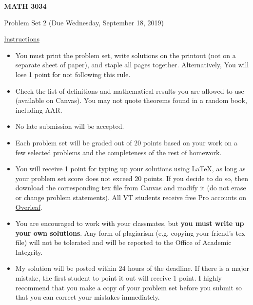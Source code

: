 \documentclass[12pt]{amsart}
\begin{document}

\hfill{}

\vspace{0.3in}
\begin{center}
{\Large{\textbf{MATH 3034}}}

\vspace{0.1in}
{\large{Problem Set 2 (Due Wednesday, September 18, 2019)}}
\end{center}

\vspace{0.3in}
\noindent
\underline{Instructions}
\begin{itemize}
\vspace{0.1in}
\item You must print the problem set, write solutions on the printout (not on a separate sheet of paper), and staple all pages together.  Alternatively,  You will lose 1 point for not following this rule.
\vspace{0.1in}
\item Check the list of definitions and mathematical results you are allowed to use (available on Canvas).  You may not quote theorems found in a random book, including AAR.
\vspace{0.1in}
\item No late submission will be accepted.
\vspace{0.1in}
\item Each problem set will be graded out of 20 points based on your work on a few selected problems and the completeness of the rest of homework.
\vspace{0.1in}
\item You will receive 1 point for typing up your solutions using \LaTeX, as long as your problem set score does not exceed 20 points.  If you decide to do so, then download the corresponding tex file from Canvas and modify it (do not erase or change problem statements).  All VT students receive free Pro accounts on \href{https://www.overleaf.com/edu/vtech}{Overleaf}.
\vspace{0.1in}
\item You are encouraged to work with your classmates, but \textbf{you must write up your own solutions}.  Any form of plagiarism (e.g. copying your friend's tex file) will not be tolerated and will be reported to the Office of Academic Integrity.
\vspace{0.1in}
\item My solution will be posted within 24 hours of the deadline.  If there is a major mistake, the first student to point it out will receive 1 point.  I highly recommend that you make a copy of your problem set before you submit so that you can correct your mistakes immediately.
\end{itemize}
\end{document}
